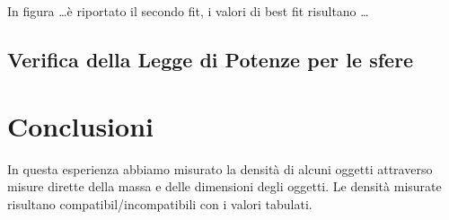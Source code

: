 \documentclass{article}
\begin{document}
In figura \ldots  \`e riportato il secondo fit, i valori di best fit risultano \ldots

\subsection{Verifica della Legge di Potenze per le sfere}


\section{Conclusioni}
In questa esperienza abbiamo misurato la densit\`a di alcuni oggetti attraverso misure dirette della massa e delle dimensioni degli oggetti. Le densit\`a misurate risultano compatibil/incompatibili con i valori tabulati.
\end{document}
